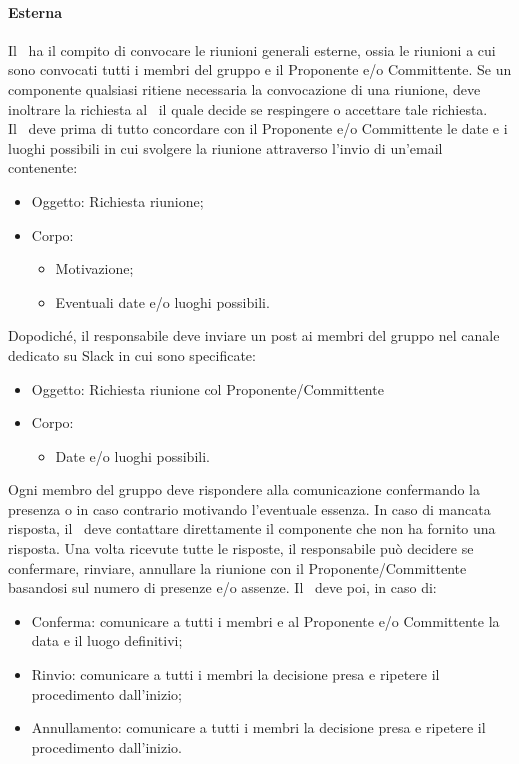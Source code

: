 \documentclass[../NormeDiProgetto.tex]{subfiles}
\begin{document}
					\paragraph{Esterna\\}
						Il \responsabilediprogetto\ ha il compito di convocare le riunioni generali esterne,
						ossia le riunioni a cui sono convocati tutti i membri del gruppo e
						il Proponente e/o Committente.
						Se un componente qualsiasi ritiene necessaria la convocazione di una riunione, deve
						inoltrare la richiesta al \responsabilediprogetto\ il quale decide se respingere o
						accettare tale richiesta.\\
						Il \responsabilediprogetto\ deve prima di tutto concordare con il Proponente e/o
						Committente le date e i luoghi possibili in cui svolgere la riunione attraverso
						l'invio di un'email contenente:
						\begin{itemize}
							\item Oggetto: Richiesta riunione;
							\item Corpo:
							\begin{itemize}
								\item Motivazione;
								\item Eventuali date e/o luoghi possibili.
							\end{itemize}
						\end{itemize}
						Dopodiché, il responsabile deve inviare un post ai
						membri del gruppo nel canale dedicato su Slack in cui sono specificate:
						\begin{itemize}
							\item Oggetto: Richiesta riunione col Proponente/Committente
							\item Corpo:
							\begin{itemize}
								\item Date e/o luoghi possibili.
							\end{itemize}
						\end{itemize}
						Ogni membro del gruppo deve rispondere alla comunicazione confermando la presenza o
						in caso contrario motivando l'eventuale essenza. In caso di mancata risposta, il
						\responsabilediprogetto\ deve contattare direttamente il componente che non ha
						fornito una risposta. Una volta ricevute tutte le risposte, il responsabile può
						decidere se confermare, rinviare, annullare la riunione con il Proponente/Committente
						basandosi sul numero di presenze e/o assenze.
						Il \responsabilediprogetto\ deve poi, in caso di:
						\begin{itemize}
							\item Conferma: comunicare a tutti i membri e al Proponente e/o Committente
							la data e il luogo definitivi;
							\item Rinvio: comunicare a tutti i membri la decisione presa e ripetere
							il procedimento dall'inizio;
							\item Annullamento: comunicare a tutti i membri la decisione presa e
							ripetere il procedimento dall'inizio.
						\end{itemize}
\end{document}
